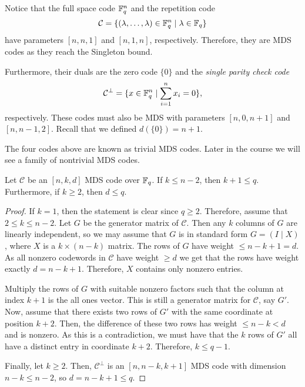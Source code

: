 \documentclass[../main.tex]{subfiles}
\begin{document}
\begin{example}
Notice that the full space code $\mathbb{F}_q^n$ and the repetition code
\begin{equation*}
    \mathcal{C} = \{(\lambda, \dots, \lambda) \in \mathbb{F}_q^n \mid \lambda \in \mathbb{F}_q \}
\end{equation*}
have parameters $[n, n, 1]$ and $[n, 1, n]$, respectively. Therefore, they are MDS codes as they reach the Singleton bound.

Furthermore, their duals are the zero code $\{0\}$ and the \emph{single parity check code}
\begin{equation*}
    \mathcal{C}^\perp = \{ x \in \mathbb{F}_q^n \mid \sum_{i=1}^n x_i = 0 \},
\end{equation*}
respectively. These codes must also be MDS with parameters $[n, 0, n + 1]$ and $[n, n - 1, 2]$. Recall that we defined $d(\{0\}) = n + 1$.
\end{example}

The four codes above are known as trivial MDS codes. Later in the course we will see a family of nontrivial MDS codes.

\begin{theorem}
Let $\mathcal{C}$ be an $[n, k, d]$ MDS code over $\mathbb{F}_q$. If $k \leq n - 2$, then $k + 1 \leq q$. Furthermore, if $k \geq 2$, then $d \leq q$.
\end{theorem}

\begin{proof}
If $k = 1$, then the statement is clear since $q \geq 2$. Therefore, assume that $2 \leq k \leq n - 2$. Let $G$ be the generator matrix of $\mathcal{C}$. Then any $k$ columns of $G$ are linearly independent, so we may assume that $G$ is in standard form $G = (I \mid X)$, where $X$ is a $k \times (n - k)$ matrix. The rows of $G$ have weight $\leq n - k + 1 = d$. As all nonzero codewords in $\mathcal{C}$ have weight $\geq d$ we get that the rows have weight exactly $d = n - k + 1$. Therefore, $X$ contains only nonzero entries.

Multiply the rows of $G$ with suitable nonzero factors such that the column at index $k + 1$ is the all ones vector. This is still a generator matrix for $\mathcal{C}$, say $G'$. Now, assume that there exists two rows of $G'$ with the same coordinate at position $k + 2$. Then, the difference of these two rows has weight $\leq n - k < d$ and is nonzero. As this is a contradiction, we must have that the $k$ rows of $G'$ all have a distinct entry in coordinate $k + 2$. Therefore, $k \leq q - 1$.

Finally, let $k \geq 2$. Then, $\mathcal{C}^\perp$ is an $[n, n - k, k + 1]$ MDS code with dimension $n - k \leq n - 2$, so $d = n - k + 1 \leq q$.
\end{proof}
\end{document}
